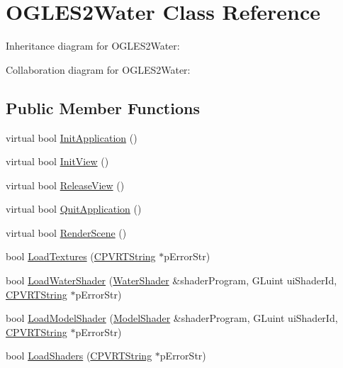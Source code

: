 \hypertarget{class_o_g_l_e_s2_water}{\section{O\+G\+L\+E\+S2\+Water Class Reference}
\label{class_o_g_l_e_s2_water}
}


Inheritance diagram for O\+G\+L\+E\+S2\+Water\+:


Collaboration diagram for O\+G\+L\+E\+S2\+Water\+:
\subsection*{Public Member Functions}
\begin{DoxyCompactItemize}
\item 
virtual bool \hyperlink{class_o_g_l_e_s2_water_a62041b0906766ba1af233d3a5bab4f17}{Init\+Application} ()
\item 
virtual bool \hyperlink{class_o_g_l_e_s2_water_a2da566592e1831ed3d9b4b2d0b400105}{Init\+View} ()
\item 
virtual bool \hyperlink{class_o_g_l_e_s2_water_a08a0e946b367a5694bbf3d78d3799c01}{Release\+View} ()
\item 
virtual bool \hyperlink{class_o_g_l_e_s2_water_a70c1246dfb8340f4e8dc44e5d4c87fa4}{Quit\+Application} ()
\item 
virtual bool \hyperlink{class_o_g_l_e_s2_water_a43aedbce04a12af28c9dce20c4acfe40}{Render\+Scene} ()
\item 
bool \hyperlink{class_o_g_l_e_s2_water_a6e62abc754164c41ac62d560cccc10fa}{Load\+Textures} (\hyperlink{class_c_p_v_r_t_string}{C\+P\+V\+R\+T\+String} $\ast$p\+Error\+Str)
\item 
bool \hyperlink{class_o_g_l_e_s2_water_aa8781b71b5b0bf86731dfed307fc73c5}{Load\+Water\+Shader} (\hyperlink{struct_water_shader}{Water\+Shader} \&shader\+Program, G\+Luint ui\+Shader\+Id, \hyperlink{class_c_p_v_r_t_string}{C\+P\+V\+R\+T\+String} $\ast$p\+Error\+Str)
\item 
bool \hyperlink{class_o_g_l_e_s2_water_a8ef111d5106cc0d90e3df8e1b9a03b7e}{Load\+Model\+Shader} (\hyperlink{struct_model_shader}{Model\+Shader} \&shader\+Program, G\+Luint ui\+Shader\+Id, \hyperlink{class_c_p_v_r_t_string}{C\+P\+V\+R\+T\+String} $\ast$p\+Error\+Str)
\item 
bool \hyperlink{class_o_g_l_e_s2_water_a12e413a189d19f935830cdabce31d508}{Load\+Shaders} (\hyperlink{class_c_p_v_r_t_string}{C\+P\+V\+R\+T\+String} $\ast$p\+Error\+Str)
\item 

\end{DoxyCompactItemize}
